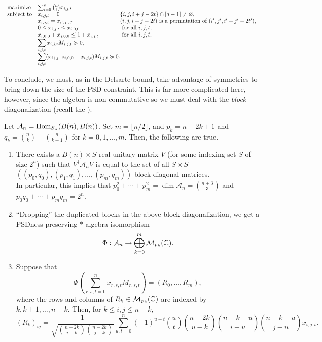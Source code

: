 	\begin{equation}
		\label{indep-sdp2}
		\begin{array}{ll@{}ll}
		\text{maximize}  & \sum_{i=0}^{n} \binom{n}{i} x_{i,j,t}  &\\
		\text{subject to} \displaystyle & x_{i,j,t} = 0 & \{i,j,i+j-2t\} \cap [d-1] \ne \emptyset, \\
		& \displaystyle x_{i,j,t} = x_{i',j',t'} & \text{$(i,j,i+j-2t)$ is a permutation of $(i',j',i'+j'-2t')$}, \\
		& \displaystyle 0 \le x_{i,j,t} \le x_{i,0,0} & \text{ for all $i,j,t$}, \\
		& \displaystyle x_{i,0,0} + x_{j,0,0} \le 1 + x_{i,j,t} & \text{ for all $i,j,t$}, \\
		& \displaystyle \sum_{i,j,t} x_{i,j,t} M_{i,j,t} \pge 0, & \\
		& \displaystyle \sum_{i,j,t} (x_{i+j-2t,0,0} - x_{i,j,t}) M_{i,j,t} \pge 0. &
		\end{array}
	\end{equation}

	To conclude, we must, as in the Delsarte bound, take advantage of symmetries to bring down the size of the PSD constraint. This is far more complicated here, however, since the algebra is non-commutative so we must deal with the \emph{block} diagonalization (recall the ). 

	\begin{ftheo}[Schrijver]
		\label{theo:schrijver}
		Let $\mathcal{A}_n = \operatorname{Hom}_{S_n}(B(n),B(n))$. Set $m = \lfloor n/2 \rfloor$, and $p_k = n-2k+1$ and $q_k = \binom{n}{k} - \binom{n}{k-1}$ for $k=0,1,\ldots,m$. Then, the following are true.
		\begin{enumerate}[label=(\alph*)]
			\item There exists a $B(n) \times S$ real unitary matrix $V$ (for some indexing set $S$ of size $2^n$) such that $V^\dagger \mathcal{A}_n V$ is equal to the set of all $S \times S$ $((p_0,q_0),(p_1,q_1),\ldots,(p_m,q_m))$-block-diagonal matrices.\\
			In particular, this implies that $p_0^2 + \cdots + p_m^2 = \dim \mathcal{A}_n = \binom{n+3}{3}$ and $p_0q_0 + \cdots + p_mq_m = 2^n$.
			\item ``Dropping'' the duplicated blocks in the above block-diagonalization, we get a PSDness-preserving $*$-algebra isomorphism
			\[ \Phi : \mathcal{A}_n \to \bigoplus_{k=0}^m \mathcal{M}_{p_k}(\mathbb{C}). \]
			\item Suppose that
			\[ \Phi\left( \sum_{r,s,t=0}^n x_{r,s,t} M_{r,s,t} \right) = (R_0,\ldots,R_m), \]
			where the rows and columns of $R_k \in \mathcal{M}_{p_k}(\mathbb{C})$ are indexed by $k,k+1,\ldots,n-k$. Then, for $k \le i,j \le n-k$,
			\[ (R_k)_{ij} = \frac{1}{\sqrt{\binom{n-2k}{i-k}\binom{n-2k}{j-k}}} \sum_{u,t=0}^n (-1)^{u-t} \binom{u}{t} \binom{n-2k}{u-k} \binom{n-k-u}{i-u} \binom{n-k-u}{j-u} x_{i,j,t}. \]
		\end{enumerate}
	\end{ftheo}

